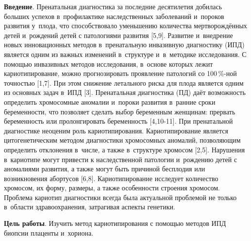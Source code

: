 \vspace{-16pt}



\makeProcTitleIIRazdel
{}

\textbf{Введение}. Пренатальная диагностика за последние десятилетия добилась больших успехов в~профилактике наследственных заболеваний и~пороков развития у~плода, что способствовало уменьшению количества мертворождённых детей и~рождений детей с патологиями развития [5,9]. Развитие и~внедрение новых инновационных методов в~пренатальную инвазивную диагностику (ИПД) является одним из важных изменений в~структуре и~в~методике исследования. С помощью инвазивных методов исследования, в~основе которых лежит кариотипирование, можно прогнозировать проявление патологий со 100\,\%-ной точностью [1,7]. При этом снижение летального риска для плода является одним из основных задач в~ИПД [3]. Пренатальная диагностика (ПД) даёт возможность определить хромосомные аномалии и~пороки развития в~ранние сроки беременности, что позволяет сделать выбор беременным женщинам: прервать беременность или пролонгировать беременность [4,10-11]. При пренатальной диагностике неоценим роль кариотипирования. Кариотипирование является цитогенетическим методом диагностики хромосомных аномалий, позволяющим определить отклонения в~числе, а также в~структуре хромосом [2,5]. Нарушения в~кариотипе могут привести к наследственной патологии и~рождению детей с аномалиями развития, а также могут быть причиной бесплодия или возникновения абортусов [6,8]. Кариотипирование исследует количество хромосом, их форму, размеры, а также особенности строения хромосом. Проблема кариотип диагностики всегда была актуальной проблемой не только в~области здравоохранения, затрагивая аспекты генетики.

\textbf{Цель работы}. Изучить метод кариотипирования с помощью методов ИПД биопсии плаценты и~хориона.

